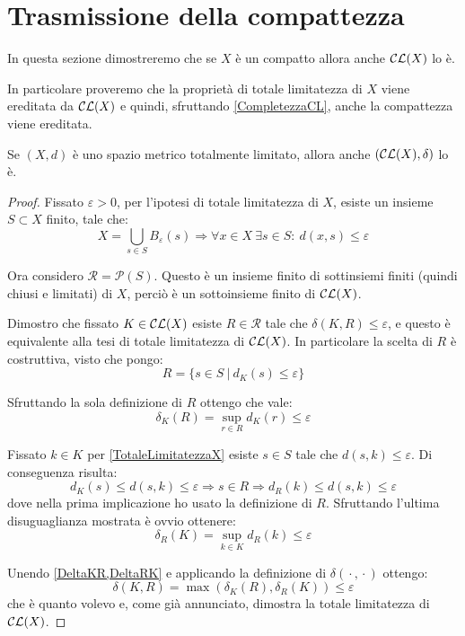 \section{Trasmissione della compattezza}
In questa sezione dimostreremo che se $X$ è un compatto allora anche $\mathcal{CL}(X)$ lo è. 

In particolare proveremo che la proprietà di totale limitatezza di $X$ viene ereditata da $\mathcal{CL}(X)$ e quindi, sfruttando \cref{CompletezzaCL}, anche la compattezza viene ereditata.

\begin{lemma}\label{TotaleLimitatezzaCL}
	Se $(X,d)$ è uno spazio metrico totalmente limitato, allora anche $(\mathcal{CL}(X),\delta)$ lo è.
\end{lemma}
\begin{proof}
	Fissato $\varepsilon>0$, per l'ipotesi di totale limitatezza di $X$, esiste un insieme $S\subset X$ finito, tale che:
	\begin{equation}\label{TotaleLimitatezzaX}
		X=\bigcup_{s\in S} B_{\varepsilon}(s) \Longrightarrow 
		\forall x\in X\ \exists s\in S:\ d(x,s)\le \varepsilon
	\end{equation}

	Ora considero $\mathcal{R}=\mathcal{P}(S)$. Questo è un insieme finito di sottinsiemi finiti (quindi chiusi e limitati) di $X$, perciò è un sottoinsieme finito di $\mathcal{CL}(X)$. 
	
	Dimostro che fissato $K\in\mathcal{CL}(X)$ esiste $R\in \mathcal{R}$ tale che $\delta(K,R)\le \varepsilon$, e questo è equivalente alla tesi di totale limitatezza di $\mathcal{CL}(X)$. In particolare la scelta di $R$ è costruttiva, visto che pongo:
	\begin{equation*}
		R=\{s\in S\ |\ d_K(s)\le \varepsilon\}
	\end{equation*}
	
	Sfruttando la sola definizione di $R$ ottengo che vale:
	\begin{equation}\label{DeltaKR}
		\delta_K(R)=\sup_{r\in R} d_K(r) \le \varepsilon
	\end{equation}
	
	Fissato $k\in K$ per \cref{TotaleLimitatezzaX} esiste $s\in S$ tale che $d(s,k)\le \varepsilon$. Di conseguenza risulta:
	\begin{equation*}
		d_K(s)\le d(s,k) \le \varepsilon \Longrightarrow s\in R \Longrightarrow d_R(k)\le d(s,k)\le \varepsilon
	\end{equation*}
	dove nella prima implicazione ho usato la definizione di $R$. 
	Sfruttando l'ultima disuguaglianza mostrata è ovvio ottenere:
	\begin{equation}\label{DeltaRK}
		\delta_R(K)=\sup_{k\in K} d_R(k) \le  \varepsilon
	\end{equation}
	
	Unendo \cref{DeltaKR,DeltaRK} e applicando la definizione di $\delta({}\cdot{},{}\cdot{})$ ottengo:
	\begin{equation*}
		\delta(K,R)=\max\left(\delta_K(R),\delta_R(K)\right)\le \varepsilon
	\end{equation*}
	che è quanto volevo e, come già annunciato, dimostra la totale limitatezza di $\mathcal{CL}(X)$.
\end{proof}

